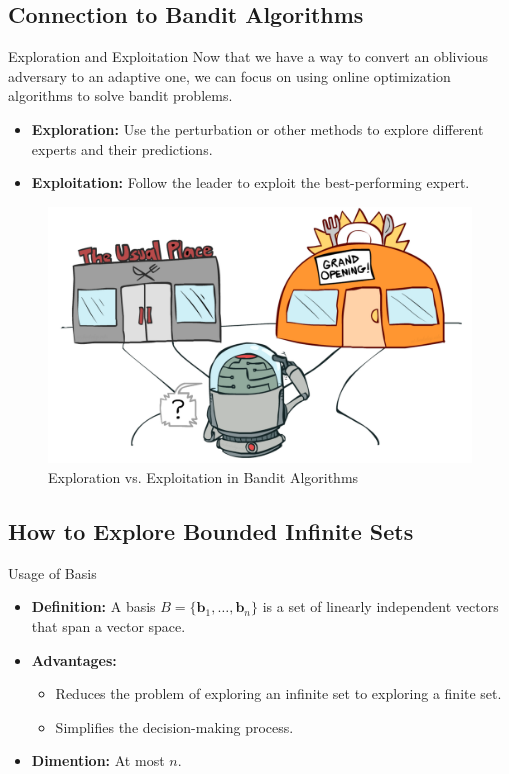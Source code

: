\documentclass{beamer}
\begin{document}
\subsection{Connection to Bandit Algorithms}
\begin{frame}{Exploration and Exploitation}
    Now that we have a way to convert an oblivious adversary to an adaptive one, we can focus on using online optimization algorithms to solve bandit problems.
    \begin{itemize}
        \item \textbf{Exploration:} Use the perturbation or other methods to explore different experts and their predictions.
        \item \textbf{Exploitation:} Follow the leader to exploit the best-performing expert.
    \end{itemize}
    \begin{figure}
        \centering
        \includegraphics[width=0.5\linewidth]{images/exploration_vs_exploitation.png}
        \caption{Exploration vs. Exploitation in Bandit Algorithms}
    \end{figure}
\end{frame}

\subsection{How to Explore Bounded Infinite Sets}
\begin{frame}{Usage of Basis}
    \begin{itemize}
        \item \textbf{Definition:} A basis $B = \{\mathbf{b}_1, \ldots, \mathbf{b}_n\}$ is a set of linearly independent vectors that span a vector space.
        \item \textbf{Advantages:}
        \begin{itemize}
            \item Reduces the problem of exploring an infinite set to exploring a finite set.
            \item Simplifies the decision-making process.
        \end{itemize}
        \item \textbf{Dimention:} At most $n$.
    \end{itemize}
\end{frame}
\end{document}
